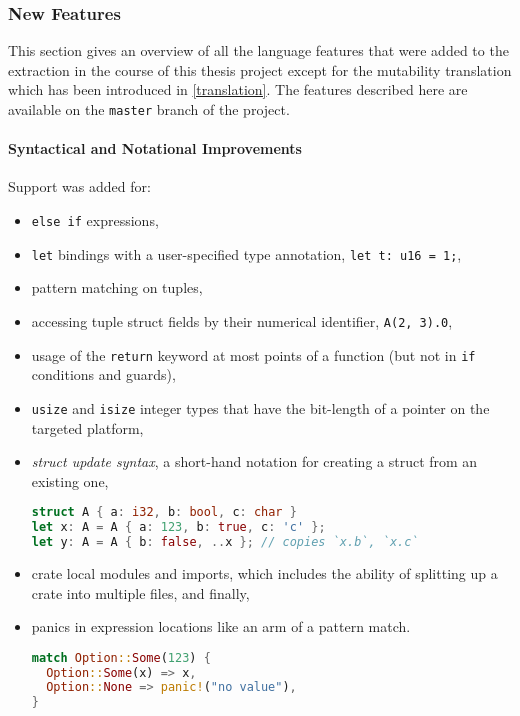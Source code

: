 \subsubsection{New Features}

This section gives an overview of all the language features that were added to
the extraction in the course of this thesis project except for the mutability
translation which has been introduced in \autoref{translation}. The features
described here are available on the \lstinline!master! branch of the project.

\paragraph{Syntactical and Notational Improvements}

Support was added for:

\begin{itemize}
\item
  \passthrough{\lstinline!else if!} expressions,
\item
  \passthrough{\lstinline!let!} bindings with a user-specified type
  annotation, \passthrough{\lstinline!let t: u16 = 1;!},
\item
  pattern matching on tuples,
\item
  accessing tuple struct fields by their numerical identifier,
  \passthrough{\lstinline!A(2, 3).0!},
\item
  usage of the \passthrough{\lstinline!return!} keyword at most points
  of a function (but not in \lstinline!if! conditions and guards),
\item
  \passthrough{\lstinline!usize!} and \passthrough{\lstinline!isize!}
  integer types that have the bit-length of a pointer on the targeted
  platform,
\item
  \emph{struct update syntax}, a short-hand notation for creating a
  struct from an existing one,
\begin{lstlisting}[language=Rust]
struct A { a: i32, b: bool, c: char }
let x: A = A { a: 123, b: true, c: 'c' };
let y: A = A { b: false, ..x }; // copies `x.b`, `x.c`
\end{lstlisting}

\item
  crate local modules and imports, which includes the ability of
  splitting up a crate into multiple files, and finally,
\item
  panics in expression locations like an arm of a pattern match.
\begin{lstlisting}[language=Rust]
match Option::Some(123) {
  Option::Some(x) => x,
  Option::None => panic!("no value"),
}
\end{lstlisting}

\end{itemize}

